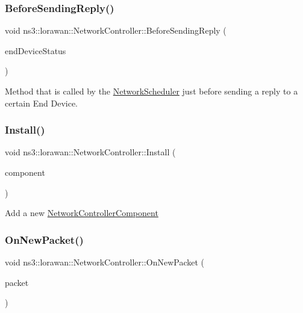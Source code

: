 \subsubsection{\texorpdfstring{Before\+Sending\+Reply()}{BeforeSendingReply()}}
{\footnotesize\ttfamily void ns3\+::lorawan\+::\+Network\+Controller\+::\+Before\+Sending\+Reply (\begin{DoxyParamCaption}\item[{Ptr$<$ \hyperlink{classns3_1_1lorawan_1_1EndDeviceStatus}{End\+Device\+Status} $>$}]{end\+Device\+Status }\end{DoxyParamCaption})}

Method that is called by the \hyperlink{classns3_1_1lorawan_1_1NetworkScheduler}{Network\+Scheduler} just before sending a reply to a certain End Device. \mbox{\label{classns3_1_1lorawan_1_1NetworkController_a39dd06a8108bd9eb19961c2b050d47db}} 
\subsubsection{\texorpdfstring{Install()}{Install()}}
{\footnotesize\ttfamily void ns3\+::lorawan\+::\+Network\+Controller\+::\+Install (\begin{DoxyParamCaption}\item[{Ptr$<$ \hyperlink{classns3_1_1lorawan_1_1NetworkControllerComponent}{Network\+Controller\+Component} $>$}]{component }\end{DoxyParamCaption})}

Add a new \hyperlink{classns3_1_1lorawan_1_1NetworkControllerComponent}{Network\+Controller\+Component} \mbox{\label{classns3_1_1lorawan_1_1NetworkController_af2192cd404ae5c1588c4375e4396e9ef}} 
\subsubsection{\texorpdfstring{On\+New\+Packet()}{OnNewPacket()}}
{\footnotesize\ttfamily void ns3\+::lorawan\+::\+Network\+Controller\+::\+On\+New\+Packet (\begin{DoxyParamCaption}\item[{Ptr$<$ Packet const $>$}]{packet }\end{DoxyParamCaption})}

